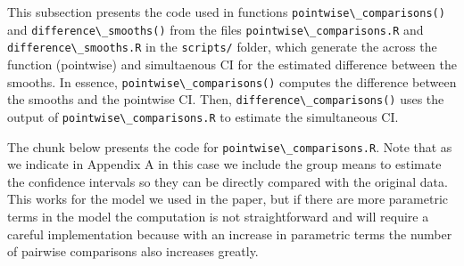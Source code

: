 \documentclass[
]{article}
\newcommand{\passthrough}[1]{#1}
\begin{document}
This subsection presents the code used in functions \passthrough{\lstinline!pointwise\_comparisons()!} and \passthrough{\lstinline!difference\_smooths()!} from the files \passthrough{\lstinline!pointwise\_comparisons.R!} and \passthrough{\lstinline!difference\_smooths.R!} in the \passthrough{\lstinline!scripts/!} folder, which generate the across the function (pointwise) and simultaenous CI for the estimated difference between the smooths. In essence, \passthrough{\lstinline!pointwise\_comparisons()!} computes the difference between the smooths and the pointwise CI. Then, \passthrough{\lstinline!difference\_comparisons()!} uses the output of \passthrough{\lstinline!pointwise\_comparisons.R!} to estimate the simultaneous CI.

The chunk below presents the code for \passthrough{\lstinline!pointwise\_comparisons.R!}. Note that as we indicate in Appendix A in this case we include the group means to estimate the confidence intervals so they can be directly compared with the original data. This works for the model we used in the paper, but if there are more parametric terms in the model the computation is not straightforward and will require a careful implementation because with an increase in parametric terms the number of pairwise comparisons also increases greatly.
\end{document}

